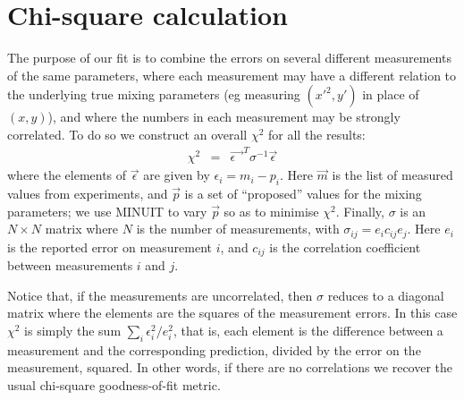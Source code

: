 \section{Chi-square calculation}
\label{sec:Chi_square_calc}
The purpose of our fit is to combine the errors on several different
measurements of the same parameters, where each measurement may have a
different relation to the underlying true mixing parameters (eg measuring
$(x'^2, y')$ in place of $(x, y)$), and where the numbers in each measurement
may be strongly correlated. To do so we construct an overall $\chi^2$ for
all the results:
\begin{eqnarray}
\chi^2 &=& \vec{\epsilon\text{ }}^T \sigma^{-1} \vec{\epsilon}
\end{eqnarray}
where the elements of $\vec{\epsilon}$ are given by
$\epsilon_i = m_i - p_i$. Here $\vec{m}$ is the list of measured
values from experiments, and $\vec{p}$ is a set of ``proposed'' values
for the mixing parameters; we use MINUIT to vary $\vec{p}$ so as
to minimise $\chi^2$. Finally, $\sigma$ is an $N\times N$ matrix where
$N$ is the number of measurements, with $\sigma_{ij} = e_i c_{ij} e_j$.
Here $e_i$ is the reported error on measurement $i$, and $c_{ij}$ is the
correlation coefficient between measurements $i$ and $j$. 

Notice that, if
the measurements are uncorrelated, then $\sigma$ reduces to
a diagonal matrix where the elements are the squares of the measurement
errors. In this case $\chi^2$ is simply the sum $\sum\limits_{i}\epsilon_i^2/e_i^2$,
that is, each element is the difference between a measurement
and the corresponding prediction, divided by the error on the measurement,
squared. In other words, if there are no correlations we recover
the usual chi-square goodness-of-fit metric. 

